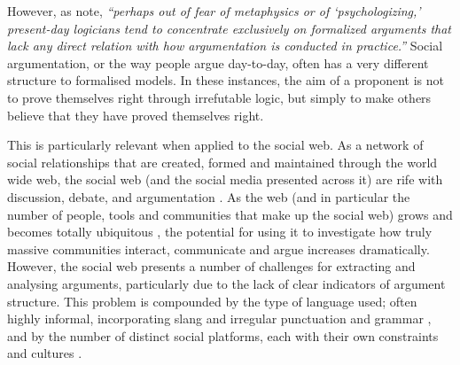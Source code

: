 However, as \citet{Van2004} note, \textit{``perhaps out of fear of metaphysics or of `psychologizing,' present-day logicians tend to concentrate exclusively on formalized arguments that lack any direct relation with how argumentation is conducted in practice.''} Social argumentation, or the way people argue day-to-day, often has a very different structure to formalised models. In these instances, the aim of a proponent is not to prove themselves right through irrefutable logic, but simply to make others believe that they have proved themselves right. 

This is particularly relevant when applied to the social web. As a network of social relationships that are created, formed and maintained through the world wide web, the social web (and the social media presented across it) are rife with discussion, debate, and argumentation \citep{rowe2011predicting}. As the web (and in particular the number of people, tools and communities that make up the social web) grows and becomes totally ubiquitous \citep[p.~559]{smith2009social}, the potential for using it to investigate how truly massive communities interact, communicate and argue increases dramatically. However, the social web presents a number of challenges for extracting and analysing arguments, particularly due to the lack of clear indicators of argument structure. This problem is compounded by the type of language used; often highly informal, incorporating slang and irregular punctuation and grammar \citep{Schneider2012}, and by the number of distinct social platforms, each with their own constraints and cultures \citep{hanna2011}.

